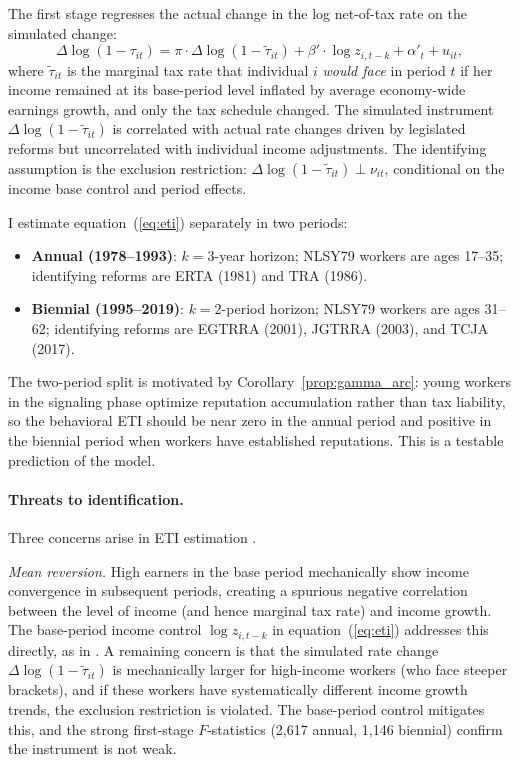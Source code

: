 \documentclass[12pt]{article}
\theoremstyle{definition}
\theoremstyle{remark}
\begin{document}
The first stage regresses the actual change in the log net-of-tax rate on the simulated
change:
\begin{equation}
\label{eq:eti_fs}
\Delta \log(1 - \tau_{it}) = \pi \cdot \Delta \log(1 - \tilde{\tau}_{it}) + \beta' \cdot \log z_{i,t-k} + \alpha'_t + u_{it},
\end{equation}
where $\tilde{\tau}_{it}$ is the marginal tax rate that individual $i$ \emph{would face}
in period $t$ if her income remained at its base-period level inflated by average economy-wide
earnings growth, and only the tax schedule changed. The simulated instrument $\Delta \log(1 -
\tilde{\tau}_{it})$ is correlated with actual rate changes driven by legislated reforms but
uncorrelated with individual income adjustments. The identifying assumption is the exclusion
restriction: $\Delta \log(1 - \tilde{\tau}_{it}) \perp \nu_{it}$, conditional on the income
base control and period effects.

I estimate equation~(\ref{eq:eti}) separately in two periods:
\begin{itemize}
\item \textbf{Annual (1978--1993)}: $k = 3$-year horizon; NLSY79 workers are ages 17--35;
  identifying reforms are ERTA (1981) and TRA (1986).
\item \textbf{Biennial (1995--2019)}: $k = 2$-period horizon; NLSY79 workers are ages 31--62;
  identifying reforms are EGTRRA (2001), JGTRRA (2003), and TCJA (2017).
\end{itemize}

The two-period split is motivated by Corollary~\ref{prop:gamma_arc}: young workers in the
signaling phase optimize reputation accumulation rather than tax liability, so the behavioral
ETI should be near zero in the annual period and positive in the biennial period when workers
have established reputations. This is a testable prediction of the model.

\paragraph{Threats to identification.} Three concerns arise in ETI estimation
\citep{kopczuk2005tax, saez2012elasticity}.

\emph{Mean reversion.} High earners in the base period mechanically show income convergence
in subsequent periods, creating a spurious negative correlation between the level of income
(and hence marginal tax rate) and income growth. The base-period income control $\log z_{i,t-k}$
in equation~(\ref{eq:eti}) addresses this directly, as in \citet{gruber2002elasticity}. A
remaining concern is that the simulated rate change $\Delta \log(1 - \tilde{\tau}_{it})$ is
mechanically larger for high-income workers (who face steeper brackets), and if these workers
have systematically different income growth trends, the exclusion restriction is violated.
The base-period control mitigates this, and the strong first-stage $F$-statistics (2,617
annual, 1,146 biennial) confirm the instrument is not weak.
\end{document}
